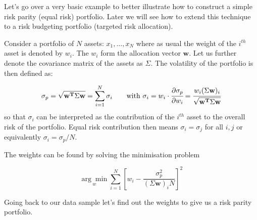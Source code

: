 Let's go over a very basic example to better illustrate how to construct
a simple risk parity (equal risk) portfolio. Later we will see how
to extend this technique to a risk budgeting portfolio (targeted risk
allocation).

Consider a portfolio of \(N\) assets: \(x_{1}, \ldots, x_N\) where as
usual the weight of the $i^{th}$ asset is denoted by \(w_{i}\). The
\(w_{i}\) form the allocation vector \(\mathbf{w}\). Let us further
denote the covariance matrix of the assets as \(\Sigma\). The volatility
of the portfolio is then defined as:

\[ \sigma_p={\sqrt {\mathbf{w^T}\Sigma \mathbf{w}}} = \sum_{i=1}^{N}\sigma _{i}\qquad\textrm{with}~\sigma _{i} = w_{i}\cdot \cfrac{\partial\sigma_p}{\partial w_{i}}={\cfrac {w_{i}(\Sigma \mathbf{w})_{i}}{\sqrt {\mathbf{w^T}\Sigma \mathbf{w}}}}\]
so that \(\sigma _{i}\) can be interpreted as the contribution of the $i^{th}$ asset to the overall risk of the portfolio.
Equal risk contribution then means \(\sigma _{i} =\sigma _{j}\) for all
\(i,j\) or equivalently \(\sigma _{i}=\sigma_p/N\).

The weights can be found by solving the minimisation problem

\[ \underset{w}{\arg \min } \sum _{i=1}^{N}\left[w_{i}-{\frac {\sigma_p^{2}}{(\Sigma \mathbf{w})_{i}N}}\right]^{2} \]

Going back to our data sample let's find out the weights to give us a
risk parity portfolio.

